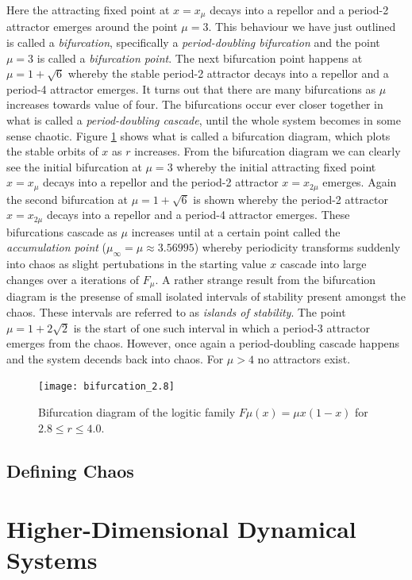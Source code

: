 \documentclass[11pt,a4paper,oneside]{memoir}
\theoremstyle{plain}
\theoremstyle{definition}
\begin{document}
Here the attracting fixed point at $x = x_\mu$ decays into a repellor and a period-2 attractor emerges around the point $\mu = 3$. This behaviour we have just outlined is called a \emph{bifurcation}, specifically a \emph{period-doubling bifurcation} and the point $\mu = 3$ is called a \emph{bifurcation point}. The next bifurcation point happens at $\mu = 1 + \sqrt{6}$ whereby the stable period-2 attractor decays into a repellor and a period-4 attractor emerges. It turns out that there are many bifurcations as $\mu$ increases towards value of four. The bifurcations occur ever closer together in what is called a \emph{period-doubling cascade}, until the whole system becomes in some sense chaotic. Figure \ref{fig:bifurcation_2.8} shows what is called a bifurcation diagram, which plots the stable orbits of $x$ as $r$ increases. From the bifurcation diagram we can clearly see the initial bifurcation at $\mu=3$ whereby the initial attracting fixed point $x = x_\mu$ decays into a repellor and the period-2 attractor $x = x_{2\mu}$ emerges. Again the second bifurcation at $\mu = 1 + \sqrt{6}$ is shown whereby the period-2 attractor $x = x_{2\mu}$ decays into a repellor and a period-4 attractor emerges. These bifurcations cascade as $\mu$ increases until at a certain point called the \emph{accumulation point} ($\mu_\infty = \mu \approx 3.56995$) whereby periodicity transforms suddenly into chaos as slight pertubations in the starting value $x$ cascade into large changes over a iterations of $F_\mu$. A rather strange result from the bifurcation diagram is the presense of small isolated intervals of stability present amongst the chaos. These intervals are referred to as \emph{islands of stability}. The point $\mu = 1 + 2\sqrt{2}$ is the start of one such interval in which a period-3 attractor emerges from the chaos. However, once again a period-doubling cascade happens and the system decends back into chaos. For $\mu > 4$ no attractors exist.
\begin{figure}[h]
    \centering
    \texttt{[image: bifurcation\_2.8]}
    \caption{Bifurcation diagram of the logitic family $F\mu(x) = \mu x(1-x)$ for $2.8 \leq r \leq 4.0$.}
    \label{fig:bifurcation_2.8}
\end{figure}

\section{Defining Chaos}



\chapter{Higher-Dimensional Dynamical Systems}
\end{document}
